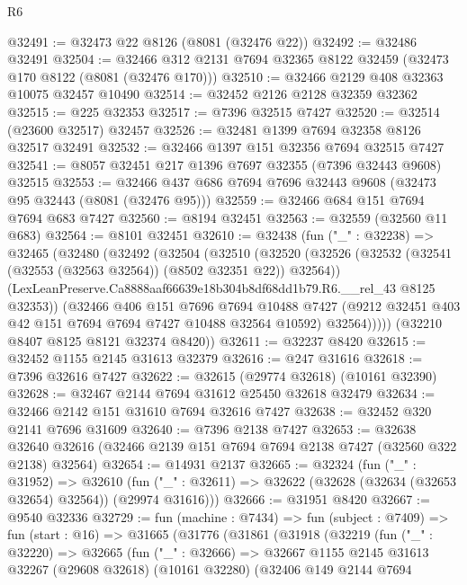 \begin{lexlean}{R6}
\begin{coremodule}
@32491 := @32473 @22 @8126 (@8081 (@32476 @22))
@32492 := @32486 @32491
@32504 := @32466 @312 @2131 @7694 @32365 @8122 @32459 (@32473 @170 @8122 (@8081 (@32476 @170)))
@32510 := @32466 @2129 @408 @32363 @10075 @32457 @10490
@32514 := @32452 @2126 @2128 @32359 @32362
@32515 := @225 @32353
@32517 := @7396 @32515 @7427
@32520 := @32514 (@23600 @32517) @32457
@32526 := @32481 @1399 @7694 @32358 @8126 @32517 @32491
@32532 := @32466 @1397 @151 @32356 @7694 @32515 @7427
@32541 := @8057 @32451 @217 @1396 @7697 @32355 (@7396 @32443 @9608) @32515
@32553 := @32466 @437 @686 @7694 @7696 @32443 @9608 (@32473 @95 @32443 (@8081 (@32476 @95)))
@32559 := @32466 @684 @151 @7694 @7694 @683 @7427
@32560 := @8194 @32451
@32563 := @32559 (@32560 @11 @683)
@32564 := @8101 @32451
@32610 := @32438
    (fun ("_" : @32238) =>
    @32465
      (@32480
        (@32492
          (@32504
            (@32510
              (@32520
                (@32526 (@32532 (@32541 (@32553 (@32563 @32564)) (@8502 @32351 @22)) @32564))
                (LexLeanPreserve.Ca8888aaf66639e18b304b8df68dd1b79.R6.__rel_43 @8125 @32353))
              (@32466
                @406
                @151
                @7696
                @7694
                @10488
                @7427
                (@9212 @32451 @403 @42 @151 @7694 @7694 @7427 @10488 @32564 @10592)
                @32564)))))
      (@32210 @8407 @8125 @8121 @32374 @8420))
@32611 := @32237 @8420
@32615 := @32452 @1155 @2145 @31613 @32379
@32616 := @247 @31616
@32618 := @7396 @32616 @7427
@32622 := @32615 (@29774 @32618) (@10161 @32390)
@32628 := @32467 @2144 @7694 @31612 @25450 @32618 @32479
@32634 := @32466 @2142 @151 @31610 @7694 @32616 @7427
@32638 := @32452 @320 @2141 @7696 @31609
@32640 := @7396 @2138 @7427
@32653 := @32638
    @32640
    @32616
    (@32466 @2139 @151 @7694 @7694 @2138 @7427 (@32560 @322 @2138) @32564)
@32654 := @14931 @2137
@32665 := @32324
    (fun ("_" : @31952) =>
    @32610 (fun ("_" : @32611) => @32622 (@32628 (@32634 (@32653 @32654) @32564)) (@29974 @31616)))
@32666 := @31951 @8420
@32667 := @9540 @32336
@32729 := fun (machine : @7434) =>
  fun (subject : @7409) =>
  fun (start : @16) =>
  @31665
    (@31776
      (@31861
        (@31918
          (@32219
            (fun ("_" : @32220) =>
            @32665
              (fun ("_" : @32666) =>
              @32667
                @1155
                @2145
                @31613
                @32267
                (@29608 @32618)
                (@10161 @32280)
                (@32406
                  @149
                  @2144
                  @7694

\end{coremodule}
\end{lexlean}
